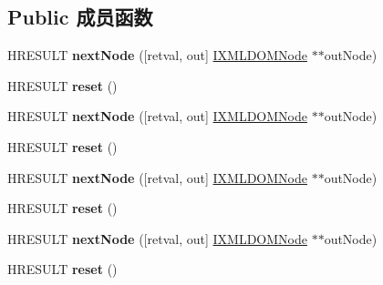 \subsection*{Public 成员函数}
\begin{DoxyCompactItemize}
\item 
\mbox{\label{interface_m_s_x_m_l2_1_1_i_x_m_l_d_o_m_node_list_ac7988ab49a0b240c94e5f6cd020987e7}} 
H\+R\+E\+S\+U\+LT {\bfseries next\+Node} (\mbox{[}retval, out\mbox{]} \hyperlink{interface_m_s_x_m_l2_1_1_i_x_m_l_d_o_m_node}{I\+X\+M\+L\+D\+O\+M\+Node} $\ast$$\ast$out\+Node)
\item 
\mbox{\label{interface_m_s_x_m_l2_1_1_i_x_m_l_d_o_m_node_list_a0285e3bfbb5e9c6cadf248237bb63c99}} 
H\+R\+E\+S\+U\+LT {\bfseries reset} ()
\item 
\mbox{\label{interface_m_s_x_m_l2_1_1_i_x_m_l_d_o_m_node_list_ac7988ab49a0b240c94e5f6cd020987e7}} 
H\+R\+E\+S\+U\+LT {\bfseries next\+Node} (\mbox{[}retval, out\mbox{]} \hyperlink{interface_m_s_x_m_l2_1_1_i_x_m_l_d_o_m_node}{I\+X\+M\+L\+D\+O\+M\+Node} $\ast$$\ast$out\+Node)
\item 
\mbox{\label{interface_m_s_x_m_l2_1_1_i_x_m_l_d_o_m_node_list_a0285e3bfbb5e9c6cadf248237bb63c99}} 
H\+R\+E\+S\+U\+LT {\bfseries reset} ()
\item 
\mbox{\label{interface_m_s_x_m_l2_1_1_i_x_m_l_d_o_m_node_list_ac7988ab49a0b240c94e5f6cd020987e7}} 
H\+R\+E\+S\+U\+LT {\bfseries next\+Node} (\mbox{[}retval, out\mbox{]} \hyperlink{interface_m_s_x_m_l2_1_1_i_x_m_l_d_o_m_node}{I\+X\+M\+L\+D\+O\+M\+Node} $\ast$$\ast$out\+Node)
\item 
\mbox{\label{interface_m_s_x_m_l2_1_1_i_x_m_l_d_o_m_node_list_a0285e3bfbb5e9c6cadf248237bb63c99}} 
H\+R\+E\+S\+U\+LT {\bfseries reset} ()
\item 
\mbox{\label{interface_m_s_x_m_l2_1_1_i_x_m_l_d_o_m_node_list_ac7988ab49a0b240c94e5f6cd020987e7}} 
H\+R\+E\+S\+U\+LT {\bfseries next\+Node} (\mbox{[}retval, out\mbox{]} \hyperlink{interface_m_s_x_m_l2_1_1_i_x_m_l_d_o_m_node}{I\+X\+M\+L\+D\+O\+M\+Node} $\ast$$\ast$out\+Node)
\item 
\mbox{\label{interface_m_s_x_m_l2_1_1_i_x_m_l_d_o_m_node_list_a0285e3bfbb5e9c6cadf248237bb63c99}} 
H\+R\+E\+S\+U\+LT {\bfseries reset} ()
\end{DoxyCompactItemize}
